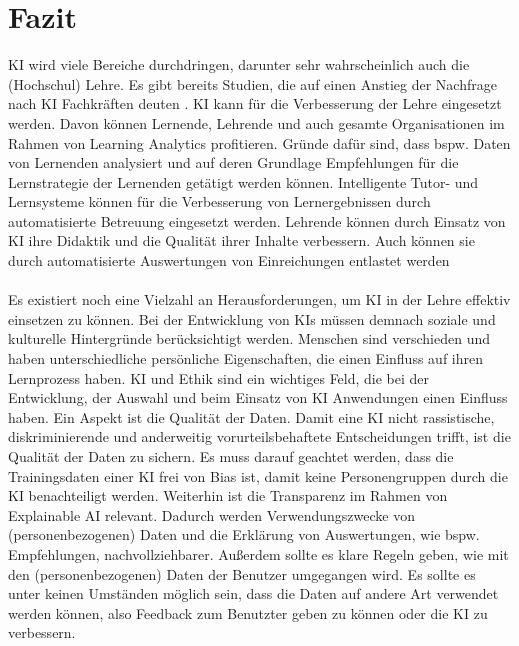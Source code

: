 \chapter{Fazit}
KI wird viele Bereiche durchdringen, darunter sehr wahrscheinlich auch die (Hochschul) Lehre.
Es gibt bereits Studien, die auf einen Anstieg der Nachfrage nach KI Fachkräften deuten \cite[S. 26]{Witt.2020}.
KI kann für die Verbesserung der Lehre eingesetzt werden. Davon können Lernende, Lehrende und auch gesamte Organisationen im Rahmen von Learning Analytics profitieren.
Gründe dafür sind, dass bspw. Daten von Lernenden analysiert und auf deren Grundlage Empfehlungen für die Lernstrategie der Lernenden getätigt werden können. %
Intelligente Tutor- und Lernsysteme können für die Verbesserung von Lernergebnissen durch automatisierte Betreuung eingesetzt werden. %
Lehrende können durch Einsatz von KI ihre Didaktik und die Qualität ihrer Inhalte verbessern.
Auch können sie durch automatisierte Auswertungen von Einreichungen entlastet werden \cite[S. 14ff]{Witt.2020}
\\
\\ \noindent
Es existiert noch eine Vielzahl an Herausforderungen, um KI in der Lehre effektiv einsetzen zu können.
Bei der Entwicklung von KIs müssen demnach soziale und kulturelle Hintergründe berücksichtigt werden.
Menschen sind verschieden und haben unterschiedliche persönliche Eigenschaften, die einen Einfluss auf ihren Lernprozess haben. \cite[S. 9ff]{Witt.2020}
KI und Ethik sind ein wichtiges Feld, die bei der Entwicklung, der Auswahl und beim Einsatz von KI Anwendungen einen Einfluss haben.
Ein Aspekt ist die Qualität der Daten. Damit eine KI nicht rassistische, diskriminierende und anderweitig vorurteilsbehaftete Entscheidungen trifft, ist die Qualität der Daten zu sichern.
Es muss darauf geachtet werden, dass die Trainingsdaten einer KI frei von Bias ist, damit keine Personengruppen durch die KI benachteiligt werden. \cite[S. 39]{Witt.2020} 
Weiterhin ist die Transparenz im Rahmen von Explainable AI relevant. Dadurch werden Verwendungszwecke von (personenbezogenen) Daten und die Erklärung von Auswertungen, wie bspw. Empfehlungen, nachvollziehbarer. \cite[S.10f; S. 39ff;]{Witt.2020}
Außerdem sollte es klare Regeln geben, wie mit den (personenbezogenen) Daten der Benutzer umgegangen wird.
Es sollte es unter keinen Umständen möglich sein, dass die Daten auf andere Art verwendet werden können, also Feedback zum Benutzter geben zu können oder die KI zu verbessern.
